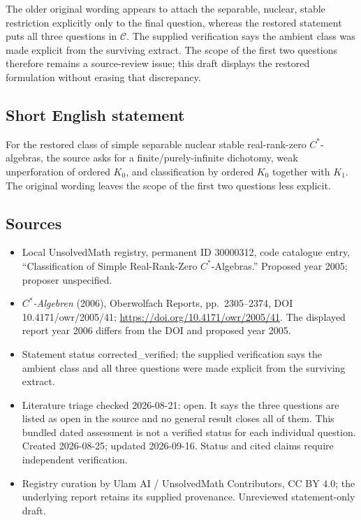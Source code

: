 \documentclass[11pt]{article}
\begin{document}
The older original wording appears to attach the separable, nuclear, stable restriction explicitly only to the final question, whereas the restored statement puts all three questions in $\mathcal C$. The supplied verification says the ambient class was made explicit from the surviving extract. The scope of the first two questions therefore remains a source-review issue; this draft displays the restored formulation without erasing that discrepancy.
\subsection{Short English statement}
For the restored class of simple separable nuclear stable real-rank-zero $C^*$-algebras, the source asks for a finite/purely-infinite dichotomy, weak unperforation of ordered $K_0$, and classification by ordered $K_0$ together with $K_1$. The original wording leaves the scope of the first two questions less explicit.
\subsection{Sources}
\begin{itemize}
\item Local UnsolvedMath registry, permanent ID 30000312, code catalogue entry, ``Classification of Simple Real-Rank-Zero $C^*$-Algebras.'' Proposed year 2005; proposer unspecified.
\item \emph{$C^*$-Algebren} (2006), Oberwolfach Reports, pp.\ 2305--2374, DOI 10.4171/owr/2005/41; \url{https://doi.org/10.4171/owr/2005/41}. The displayed report year 2006 differs from the DOI and proposed year 2005.
\item Statement status corrected\_verified; the supplied verification says the ambient class and all three questions were made explicit from the surviving extract.
\item Literature triage checked 2026-08-21: open. It says the three questions are listed as open in the source and no general result closes all of them. This bundled dated assessment is not a verified status for each individual question. Created 2026-08-25; updated 2026-09-16. Status and cited claims require independent verification.
\item Registry curation by Ulam AI / UnsolvedMath Contributors, CC BY 4.0; the underlying report retains its supplied provenance. Unreviewed statement-only draft.
\end{itemize}
\end{document}

